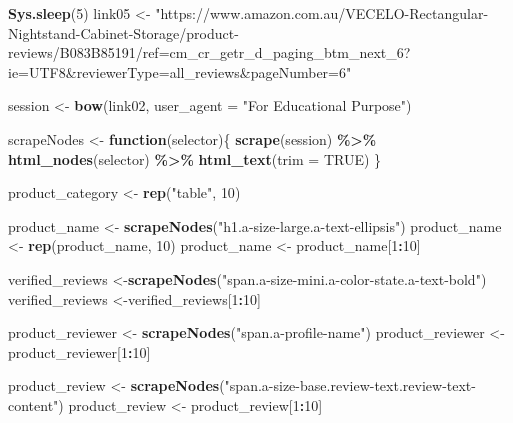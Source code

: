 \documentclass[
]{article}
\newenvironment{Shaded}{\begin{snugshade}}{\end{snugshade}}
\newcommand{\AttributeTok}[1]{\textcolor[rgb]{0.13,0.29,0.53}{#1}}
\newcommand{\ConstantTok}[1]{\textcolor[rgb]{0.56,0.35,0.01}{#1}}
\newcommand{\ControlFlowTok}[1]{\textcolor[rgb]{0.13,0.29,0.53}{\textbf{#1}}}
\newcommand{\DecValTok}[1]{\textcolor[rgb]{0.00,0.00,0.81}{#1}}
\newcommand{\FunctionTok}[1]{\textcolor[rgb]{0.13,0.29,0.53}{\textbf{#1}}}
\newcommand{\NormalTok}[1]{#1}
\newcommand{\OtherTok}[1]{\textcolor[rgb]{0.56,0.35,0.01}{#1}}
\newcommand{\SpecialCharTok}[1]{\textcolor[rgb]{0.81,0.36,0.00}{\textbf{#1}}}
\newcommand{\StringTok}[1]{\textcolor[rgb]{0.31,0.60,0.02}{#1}}
\begin{document}
\begin{Shaded}
\begin{Highlighting}[]
   \FunctionTok{Sys.sleep}\NormalTok{(}\DecValTok{5}\NormalTok{)}
\NormalTok{link05 }\OtherTok{\textless{}{-}} \StringTok{"https://www.amazon.com.au/VECELO{-}Rectangular{-}Nightstand{-}Cabinet{-}Storage/product{-}reviews/B083B85191/ref=cm\_cr\_getr\_d\_paging\_btm\_next\_6?ie=UTF8\&reviewerType=all\_reviews\&pageNumber=6"}


\NormalTok{  session }\OtherTok{\textless{}{-}} \FunctionTok{bow}\NormalTok{(link02,}
               \AttributeTok{user\_agent =} \StringTok{"For Educational Purpose"}\NormalTok{)}

\NormalTok{  scrapeNodes }\OtherTok{\textless{}{-}} \ControlFlowTok{function}\NormalTok{(selector)\{}
    \FunctionTok{scrape}\NormalTok{(session) }\SpecialCharTok{\%\textgreater{}\%}
      \FunctionTok{html\_nodes}\NormalTok{(selector) }\SpecialCharTok{\%\textgreater{}\%}
      \FunctionTok{html\_text}\NormalTok{(}\AttributeTok{trim =} \ConstantTok{TRUE}\NormalTok{)}
\NormalTok{  \}}

\NormalTok{  product\_category }\OtherTok{\textless{}{-}} \FunctionTok{rep}\NormalTok{(}\StringTok{"table"}\NormalTok{, }\DecValTok{10}\NormalTok{)}

\NormalTok{  product\_name }\OtherTok{\textless{}{-}} \FunctionTok{scrapeNodes}\NormalTok{(}\StringTok{"h1.a{-}size{-}large.a{-}text{-}ellipsis"}\NormalTok{)}
\NormalTok{  product\_name }\OtherTok{\textless{}{-}} \FunctionTok{rep}\NormalTok{(product\_name, }\DecValTok{10}\NormalTok{)}
\NormalTok{  product\_name }\OtherTok{\textless{}{-}}\NormalTok{ product\_name[}\DecValTok{1}\SpecialCharTok{:}\DecValTok{10}\NormalTok{]}
  
\NormalTok{  verified\_reviews }\OtherTok{\textless{}{-}}\FunctionTok{scrapeNodes}\NormalTok{(}\StringTok{"span.a{-}size{-}mini.a{-}color{-}state.a{-}text{-}bold"}\NormalTok{)}
\NormalTok{  verified\_reviews }\OtherTok{\textless{}{-}}\NormalTok{verified\_reviews[}\DecValTok{1}\SpecialCharTok{:}\DecValTok{10}\NormalTok{]}
  
\NormalTok{  product\_reviewer }\OtherTok{\textless{}{-}} \FunctionTok{scrapeNodes}\NormalTok{(}\StringTok{"span.a{-}profile{-}name"}\NormalTok{)}
\NormalTok{  product\_reviewer }\OtherTok{\textless{}{-}}\NormalTok{ product\_reviewer[}\DecValTok{1}\SpecialCharTok{:}\DecValTok{10}\NormalTok{]}
  
\NormalTok{  product\_review }\OtherTok{\textless{}{-}} \FunctionTok{scrapeNodes}\NormalTok{(}\StringTok{"span.a{-}size{-}base.review{-}text.review{-}text{-}content"}\NormalTok{)}
\NormalTok{  product\_review }\OtherTok{\textless{}{-}}\NormalTok{ product\_review[}\DecValTok{1}\SpecialCharTok{:}\DecValTok{10}\NormalTok{]}
  

\end{Highlighting}
\end{Shaded}
\end{document}
